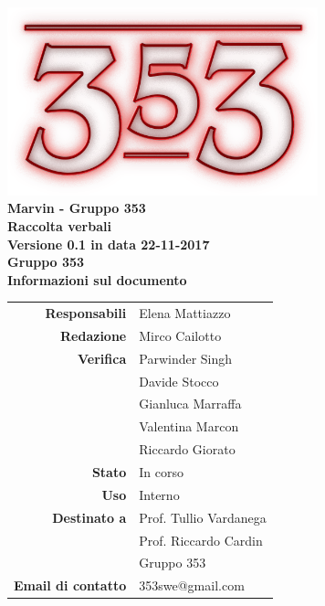 \documentclass[openany, a4paper, 12pt]{report}
\begin{document}
\begin{titlepage}
	\centering
	\vfill
	{
		\bfseries
		\vskip2cm
		\includegraphics[width=9cm]{../../common/images/logo.png} \\
		\Large Marvin - Gruppo 353\\
		\vfill
		\Huge Raccolta verbali\\
		\Large Versione 0.1 in data 22-11-2017\\
		\vfill
		\large Gruppo 353\\
		\vfill
	\normalsize Informazioni sul documento\\
\begin{table}[htbp]
	\centering
	\renewcommand\arraystretch{1.2}
	\begin{tabular}{r|l}
		\hline
		\textbf{Responsabili}	& Elena Mattiazzo\\
		
		\textbf{Redazione} 		& Mirco Cailotto\\
		
		\textbf{Verifica} 		& Parwinder Singh\\
								& Davide Stocco\\
								& Gianluca Marraffa\\
								& Valentina Marcon\\
								& Riccardo Giorato\\
						
		\textbf{Stato} 			& In corso\\
		\textbf{Uso}			& Interno\\
		\textbf{Destinato a}   	& Prof. Tullio Vardanega\\
								& Prof. Riccardo Cardin\\
								& Gruppo 353\\
		
						
		\textbf{Email di contatto}	& 353swe@gmail.com
	\end{tabular}
\end{table}
		\vfill
	}    
\end{titlepage}

\tableofcontents
\newpage
{}

 
\end{document}
